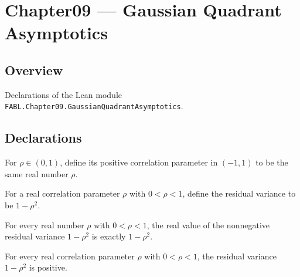 \chapter{Chapter09 — Gaussian Quadrant Asymptotics}
\section{Overview}

Declarations of the Lean module \texttt{FABL.Chapter09.GaussianQuadrantAsymptotics}.

\section{Declarations}

\begin{definition}
\label{FABL.positiveCorrelation}
\leanok
For $\rho\in(0,1)$, define its positive correlation parameter in $(-1,1)$ to be the same
real number $\rho$.
\end{definition}

\begin{definition}
\label{FABL.correlationResidualVariance}
\leanok
For a real correlation parameter $\rho$ with $0<\rho<1$, define the residual variance to
be $1-\rho^2$.
\end{definition}

\begin{theorem}
\label{FABL.coe_correlationResidualVariance}
\leanok
{}
For every real number $\rho$ with $0<\rho<1$, the real value of the nonnegative residual
variance $1-\rho^2$ is exactly $1-\rho^2$.
\end{theorem}

\begin{theorem}
\label{FABL.correlationResidualVariance_pos}
\leanok
{}
For every real correlation parameter $\rho$ with $0<\rho<1$, the residual variance
$1-\rho^2$ is positive.
\end{theorem}

